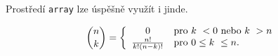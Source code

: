 \documentclass[11pt, twocolumn, a4paper]{article}
\begin{document}
Prostředí \verb|array| lze úspěšně využít i jinde.

$$
\begin{binom}
n
k
\end{binom}
=
\left\{
\begin{array}{cl}
0 & \text{pro } k\ < 0 \text{ nebo } k\ > n\\
\frac{n!}{k!(n-k)!}& \text{pro } 0\leq k\ \leq n.
\end{array} \right.
$$
\end{document}
